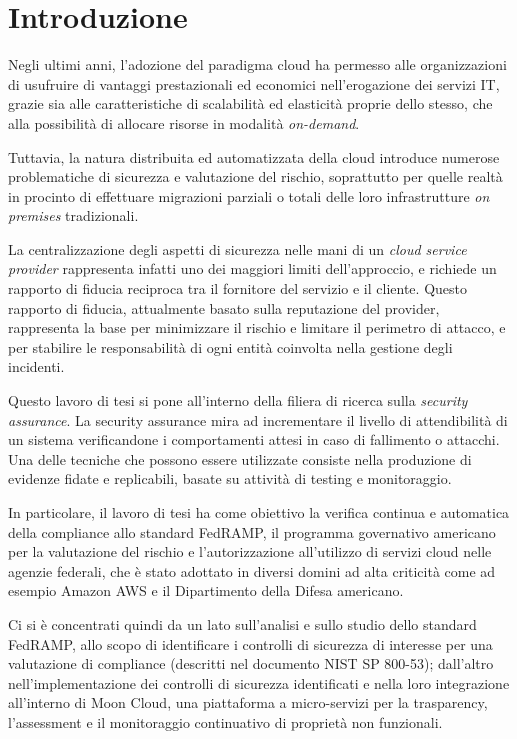 \documentclass[../main.tex]{subfiles}
\begin{document}
\chapter*{Introduzione}

Negli ultimi anni, l'adozione del paradigma cloud ha permesso alle organizzazioni di usufruire di vantaggi prestazionali ed economici nell'erogazione dei servizi IT, grazie sia alle caratteristiche di scalabilità ed elasticità proprie dello stesso, che alla possibilità di allocare risorse in modalità \textit{on-demand}.


Tuttavia, la natura distribuita ed automatizzata della cloud introduce numerose problematiche di sicurezza e valutazione del rischio, soprattutto per quelle realtà in procinto di effettuare migrazioni parziali o totali delle loro infrastrutture \emph{on premises} tradizionali.


La centralizzazione degli aspetti di sicurezza nelle mani di un \textit{cloud service provider} rappresenta infatti uno dei maggiori limiti dell'approccio, e richiede un rapporto di fiducia reciproca tra il fornitore del servizio e il cliente. Questo rapporto di fiducia, attualmente basato sulla reputazione del provider, rappresenta la base per minimizzare il rischio e limitare il perimetro di attacco, e per stabilire le responsabilità di ogni entità coinvolta nella gestione degli incidenti.


Questo lavoro di tesi si pone all'interno della filiera di ricerca sulla \textit{security assurance}.
La security assurance mira ad incrementare il livello di attendibilità di un sistema verificandone i comportamenti attesi in caso di fallimento o attacchi.
Una delle tecniche che possono essere utilizzate consiste nella produzione di evidenze fidate e replicabili, basate su attività di testing e monitoraggio.


In particolare, il lavoro di tesi ha come obiettivo la verifica continua e automatica della compliance allo standard FedRAMP, il programma governativo americano per la valutazione del rischio e l'autorizzazione all'utilizzo di servizi cloud nelle agenzie federali, che è stato adottato in diversi domini ad alta criticità come ad esempio Amazon AWS e il Dipartimento della Difesa americano.

Ci si è concentrati quindi da un lato sull'analisi e sullo studio dello standard FedRAMP, allo scopo di identificare i controlli di sicurezza di interesse per una valutazione di compliance (descritti nel documento NIST SP 800-53); dall'altro nell'implementazione dei controlli di sicurezza identificati e nella loro integrazione all'interno di Moon Cloud, una piattaforma a micro-servizi per la trasparency, l'assessment e il monitoraggio continuativo di proprietà non funzionali.
\end{document}
